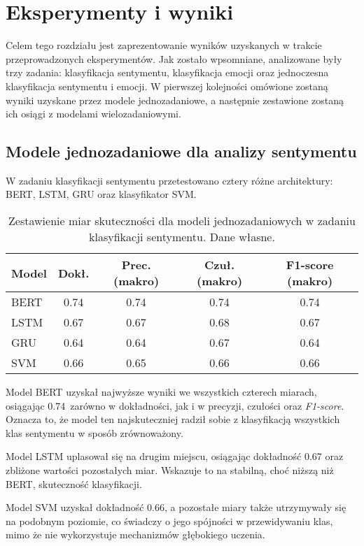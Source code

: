 \chapter{Eksperymenty i wyniki}

Celem tego rozdziału jest zaprezentowanie wyników uzyskanych w trakcie przeprowadzonych eksperymentów. Jak zostało wpsomniane, analizowane były trzy zadania: klasyfikacja sentymentu, klasyfikacja emocji oraz jednoczesna klasyfikacja sentymentu i emocji. W pierwszej kolejności omówione zostaną wyniki uzyskane przez modele jednozadaniowe, a następnie zestawione zostaną ich osiągi z modelami wielozadaniowymi.

\section{Modele jednozadaniowe dla analizy sentymentu}
W zadaniu klasyfikacji sentymentu przetestowano cztery różne architektury: BERT, LSTM, GRU oraz klasyfikator SVM.

\begin{table}[H]
\centering
\label{tab:sentiment_models}
\begin{tabular}{|l|c|c|c|c|}
\hline
\textbf{Model} & \textbf{Dokł.} & \textbf{Prec. (makro)} & \textbf{Czuł. (makro)} & \textbf{F1-score (makro)} \\
\hline
BERT & 0.74 & 0.74 & 0.74 & 0.74 \\
LSTM & 0.67 & 0.67 & 0.68 & 0.67 \\
GRU  & 0.64 & 0.64 & 0.67 & 0.64 \\
SVM  & 0.66 & 0.65 & 0.66 & 0.66 \\
\hline
\end{tabular}
\caption{Zestawienie miar skuteczności dla modeli jednozadaniowych w zadaniu klasyfikacji sentymentu. Dane własne.}
\end{table}

Model BERT uzyskał najwyższe wyniki we wszystkich czterech miarach, osiągając 0.74~zarówno w dokładności, jak i w precyzji, czułości oraz \textit{F1-score}. Oznacza to, że model ten najskuteczniej radził sobie z klasyfikacją wszystkich klas sentymentu w sposób zrównoważony.

Model LSTM uplasował się na drugim miejscu, osiągając dokładność 0.67 oraz zbliżone wartości pozostałych miar. Wskazuje to na stabilną, choć niższą niż BERT, skuteczność klasyfikacji.

Model SVM uzyskał dokładność 0.66, a pozostałe miary także utrzymywały się na podobnym poziomie, co świadczy o jego spójności w przewidywaniu klas, mimo że nie wykorzystuje mechanizmów głębokiego uczenia.

